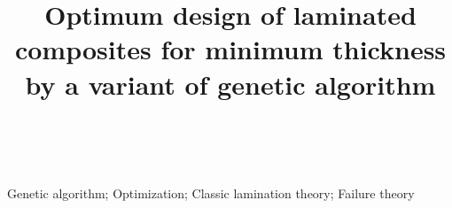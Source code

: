 \documentclass[conference, letterpaper]{IEEEtran}
\begin{document}
%
\title{Optimum design of laminated composites for minimum thickness by a variant
of genetic algorithm}


\author{\\
}



\maketitle



\begin{abstract}
	
\end{abstract}

\begin{IEEEkeywords}
Genetic algorithm; Optimization; Classic lamination theory; Failure theory
\end{IEEEkeywords}


%
\IEEEpeerreviewmaketitle













\end{document}

